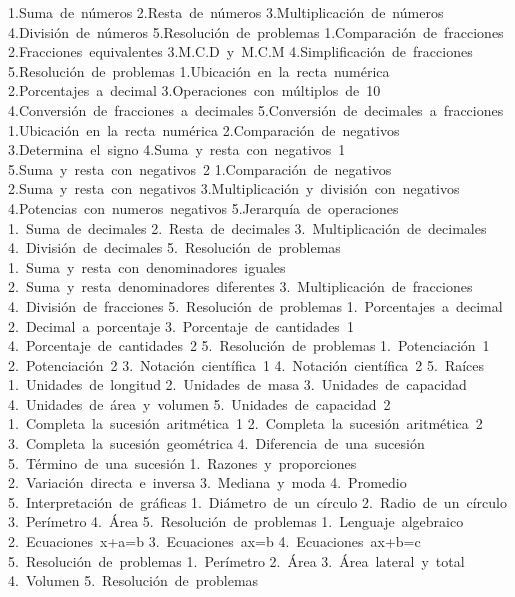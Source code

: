 1.Suma~de~números
2.Resta~de~números
3.Multiplicación~de~números
4.División~de~números
5.Resolución~de~problemas
1.Comparación~de~fracciones
2.Fracciones~equivalentes
3.M.C.D~y~M.C.M
4.Simplificación~de~fracciones
5.Resolución~de~problemas
1.Ubicación~en~la~recta~numérica
2.Porcentajes~a~decimal
3.Operaciones~con~múltiplos~de~10
4.Conversión~de~fracciones~a~decimales
5.Conversión~de~decimales~a~fracciones
1.Ubicación~en~la~recta~numérica
2.Comparación~de~negativos
3.Determina~el~signo
4.Suma~y~resta~con~negativos~1
5.Suma~y~resta~con~negativos~2
1.Comparación~de~negativos
2.Suma~y~resta~con~negativos
3.Multiplicación~y~división~con~negativos
4.Potencias~con~numeros~negativos
5.Jerarquía~de~operaciones
1.~Suma~de~decimales
2.~Resta~de~decimales
3.~Multiplicación~de~decimales
4.~División~de~decimales
5.~Resolución~de~problemas
1.~Suma~y~resta~con~denominadores~iguales
2.~Suma~y~resta~denominadores~diferentes
3.~Multiplicación~de~fracciones
4.~División~de~fracciones
5.~Resolución~de~problemas
1.~Porcentajes~a~decimal
2.~Decimal~a~porcentaje
3.~Porcentaje~de~cantidades~1
4.~Porcentaje~de~cantidades~2
5.~Resolución~de~problemas
1.~Potenciación~1
2.~Potenciación~2
3.~Notación~científica~1
4.~Notación~científica~2
5.~Raíces
1.~Unidades~de~longitud
2.~Unidades~de~masa
3.~Unidades~de~capacidad
4.~Unidades~de~área~y~volumen
5.~Unidades~de~capacidad~2
1.~Completa~la~sucesión~aritmética~1
2.~Completa~la~sucesión~aritmética~2
3.~Completa~la~sucesión~geométrica
4.~Diferencia~de~una~sucesión
5.~Término~de~una~sucesión
1.~Razones~y~proporciones
2.~Variación~directa~e~inversa
3.~Mediana~y~moda
4.~Promedio
5.~Interpretación~de~gráficas
1.~Diámetro~de~un~círculo
2.~Radio~de~un~círculo
3.~Perímetro
4.~Área
5.~Resolución~de~problemas
1.~Lenguaje~algebraico
2.~Ecuaciones~x+a=b
3.~Ecuaciones~ax=b
4.~Ecuaciones~ax+b=c
5.~Resolución~de~problemas
1.~Perímetro
2.~Área
3.~Área~lateral~y~total
4.~Volumen
5.~Resolución~de~problemas